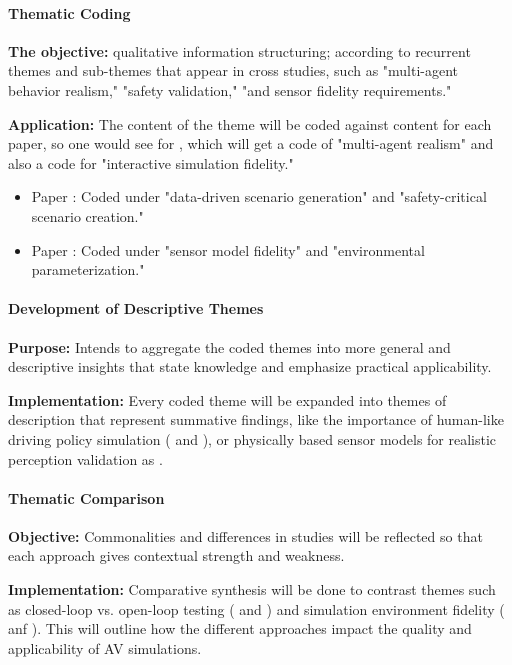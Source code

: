 \documentclass[lettersize,journal]{IEEEtran}
\begin{document}
\paragraph{Thematic Coding}

\textbf{The objective:} qualitative information structuring; according to recurrent themes and sub-themes that appear in cross studies, such as "multi-agent behavior realism," "safety validation," "and sensor fidelity requirements."

\textbf{Application:} The content of the theme will be coded against content for each paper, so one would see for \cite{ref61}, which will get a code of "multi-agent realism" and also a code for "interactive simulation fidelity."
\begin{itemize}
    \item Paper \cite{ref63}: Coded under "data-driven scenario generation" and "safety-critical scenario creation."
    \item Paper \cite{ref65}: Coded under "sensor model fidelity" and "environmental parameterization."
\end{itemize}

\paragraph{Development of Descriptive Themes}

\textbf{Purpose:} Intends to aggregate the coded themes into more general and descriptive insights that state knowledge and emphasize practical applicability.

\textbf{Implementation:} Every coded theme will be expanded into themes of description that represent summative findings, like the importance of human-like driving policy simulation (\cite{ref61} and \cite{ref62}), or physically based sensor models for realistic perception validation as \cite{ref65}.

\paragraph{Thematic Comparison}

\textbf{Objective:} Commonalities and differences in studies will be reflected so that each approach gives contextual strength and weakness.

\textbf{Implementation:} Comparative synthesis will be done to contrast themes such as closed-loop vs. open-loop testing (\cite{ref63} and \cite{ref64}) and simulation environment fidelity (\cite{ref61} anf \cite{ref64}). This will outline how the different approaches impact the quality and applicability of AV simulations.
\end{document}
